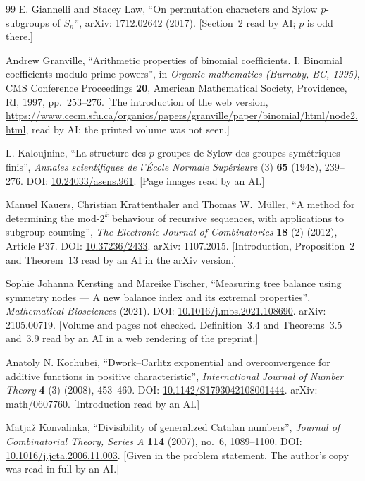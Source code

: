 \documentclass[11pt]{article}
\theoremstyle{definition}
\theoremstyle{remark}
\numberwithin{equation}{section}
\numberwithin{figure}{section}
\begin{document}
\begin{thebibliography}{99}
E. Giannelli and Stacey Law, ``On permutation characters and Sylow $p$-subgroups of $S_n$'', arXiv:
1712.02642 (2017). [Section~2 read by AI; $p$ is odd there.]

Andrew Granville, ``Arithmetic properties of binomial coefficients. I. Binomial coefficients modulo prime
powers'', in \emph{Organic mathematics (Burnaby, BC, 1995)}, CMS Conference Proceedings \textbf{20}, American
Mathematical Society, Providence, RI, 1997, pp.~253--276. [The introduction of the web version,
\url{https://www.cecm.sfu.ca/organics/papers/granville/paper/binomial/html/node2.html}, read by AI; the
printed volume was not seen.]

L. Kaloujnine, ``La structure des $p$-groupes de Sylow des groupes sym\'etriques finis'', \emph{Annales
scientifiques de l'\'Ecole Normale Sup\'erieure} (3) \textbf{65} (1948), 239--276. DOI:
\href{https://doi.org/10.24033/asens.961}{10.24033/asens.961}. [Page images read by an AI.]

Manuel Kauers, Christian Krattenthaler and Thomas W.\ M\"uller, ``A method for determining the mod-$2^k$
behaviour of recursive sequences, with applications to subgroup counting'', \emph{The Electronic Journal of
Combinatorics} \textbf{18} (2) (2012), Article P37. DOI:
\href{https://doi.org/10.37236/2433}{10.37236/2433}. arXiv: 1107.2015. [Introduction, Proposition~2 and
Theorem~13 read by an AI in the arXiv version.]

Sophie Johanna Kersting and Mareike Fischer, ``Measuring tree balance using symmetry nodes --- A new balance
index and its extremal properties'', \emph{Mathematical Biosciences} (2021). DOI:
\href{https://doi.org/10.1016/j.mbs.2021.108690}{10.1016/j.mbs.2021.108690}. arXiv: 2105.00719. [Volume and
pages not checked. Definition~3.4 and Theorems~3.5 and~3.9 read by an AI in a web rendering of the preprint.]

Anatoly N. Kochubei, ``Dwork--Carlitz exponential and overconvergence for additive functions in positive
characteristic'', \emph{International Journal of Number Theory} \textbf{4} (3) (2008), 453--460. DOI:
\href{https://doi.org/10.1142/S1793042108001444}{10.1142/S1793042108001444}. arXiv: math/0607760.
[Introduction read by an AI.]

Matja\v{z} Konvalinka, ``Divisibility of generalized Catalan numbers'', \emph{Journal of Combinatorial Theory,
Series A} \textbf{114} (2007), no.~6, 1089--1100. DOI:
\href{https://doi.org/10.1016/j.jcta.2006.11.003}{10.1016/j.jcta.2006.11.003}. [Given in the problem
statement. The author's copy was read in full by an AI.]


\end{thebibliography}
\end{document}
